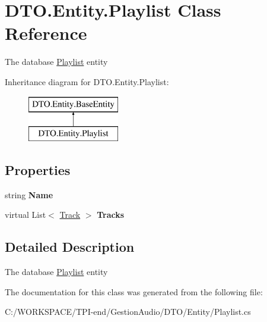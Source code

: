 \hypertarget{class_d_t_o_1_1_entity_1_1_playlist}{}\section{D\+T\+O.\+Entity.\+Playlist Class Reference}
\label{class_d_t_o_1_1_entity_1_1_playlist}


The database \hyperlink{class_d_t_o_1_1_entity_1_1_playlist}{Playlist} entity  


Inheritance diagram for D\+T\+O.\+Entity.\+Playlist\+:\begin{figure}[H]
\begin{center}
\leavevmode
\includegraphics[height=2.000000cm]{class_d_t_o_1_1_entity_1_1_playlist}
\end{center}
\end{figure}
\subsection*{Properties}
\begin{DoxyCompactItemize}
\item 
\mbox{\label{class_d_t_o_1_1_entity_1_1_playlist_a9e384c0b935acf1f89e227fefda92e6c}} 
string {\bfseries Name}
\item 
\mbox{\label{class_d_t_o_1_1_entity_1_1_playlist_a54e6e840c74fca0128bdb0b7cd41b26b}} 
virtual List$<$ \hyperlink{class_d_t_o_1_1_entity_1_1_track}{Track} $>$ {\bfseries Tracks}
\end{DoxyCompactItemize}


\subsection{Detailed Description}
The database \hyperlink{class_d_t_o_1_1_entity_1_1_playlist}{Playlist} entity 



The documentation for this class was generated from the following file\+:\begin{DoxyCompactItemize}
\item 
C\+:/\+W\+O\+R\+K\+S\+P\+A\+C\+E/\+T\+P\+I-\/end/\+Gestion\+Audio/\+D\+T\+O/\+Entity/Playlist.\+cs\end{DoxyCompactItemize}
